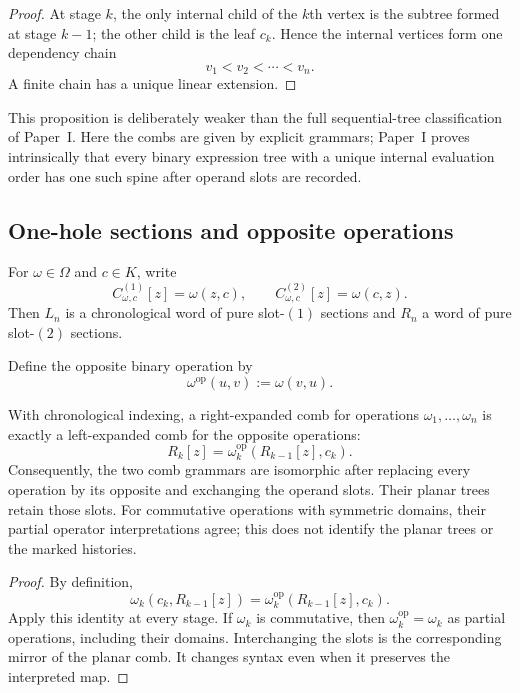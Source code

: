\begin{proof}
At stage $k$, the only internal child of the $k$th vertex is the subtree formed
at stage $k-1$; the other child is the leaf $c_k$.  Hence the internal vertices
form one dependency chain
\[
  v_1<v_2<\cdots<v_n.
\]
A finite chain has a unique linear extension.
\end{proof}

This proposition is deliberately weaker than the full sequential-tree
classification of Paper~I.  Here the combs are given by explicit grammars;
Paper~I proves intrinsically that every binary expression tree with a unique
internal evaluation order has one such spine after operand slots are recorded.

\subsection{One-hole sections and opposite operations}

For $\omega\in\Omega$ and $c\in K$, write
\[
  C^{(1)}_{\omega,c}[z]=\omega(z,c),
  \qquad
  C^{(2)}_{\omega,c}[z]=\omega(c,z).
\]
Then $L_n$ is a chronological word of pure slot-$(1)$ sections and $R_n$ a
word of pure slot-$(2)$ sections.

Define the opposite binary operation by
\[
  \omega^{\mathrm{op}}(u,v):=\omega(v,u).
\]

\begin{proposition}
\label{prop:p0-comb-opposition}
With chronological indexing, a right-expanded comb for operations
$\omega_1,\ldots,\omega_n$ is exactly a left-expanded comb for the opposite
operations:
\[
  R_k[z]
  =\omega_k^{\mathrm{op}}(R_{k-1}[z],c_k).
\]
Consequently, the two comb grammars are isomorphic after replacing every
operation by its opposite and exchanging the operand slots.  Their planar
trees retain those slots.  For commutative operations with symmetric domains,
their partial operator interpretations agree; this does not identify the
planar trees or the marked histories.
\end{proposition}

\begin{proof}
By definition,
\[
  \omega_k(c_k,R_{k-1}[z])
  =\omega_k^{\mathrm{op}}(R_{k-1}[z],c_k).
\]
Apply this identity at every stage.  If $\omega_k$ is commutative, then
$\omega_k^{\mathrm{op}}=\omega_k$ as partial operations, including their
domains.  Interchanging the slots is the corresponding mirror of the
planar comb.  It changes syntax even when it preserves the interpreted map.
\end{proof}

